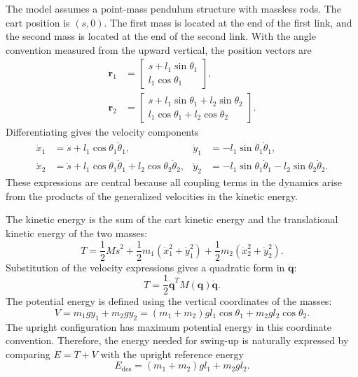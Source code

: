 \documentclass[11pt,a4paper]{article}
\begin{document}
The model assumes a point-mass pendulum structure with massless rods. The cart position is $(s,0)$. The first mass is located at the end of the first link, and the second mass is located at the end of the second link. With the angle convention measured from the upward vertical, the position vectors are
\begin{align}
    \bm r_1 &=
    \begin{bmatrix}
        s + l_1\sin\theta_1\\
        l_1\cos\theta_1
    \end{bmatrix},\\
    \bm r_2 &=
    \begin{bmatrix}
        s + l_1\sin\theta_1 + l_2\sin\theta_2\\
        l_1\cos\theta_1 + l_2\cos\theta_2
    \end{bmatrix}.
\end{align}
Differentiating gives the velocity components
\begin{align}
    \dot{x}_1 &= \dot{s}+l_1\cos\theta_1\dot{\theta}_1,
    &\dot{y}_1 &= -l_1\sin\theta_1\dot{\theta}_1,\\
    \dot{x}_2 &= \dot{s}+l_1\cos\theta_1\dot{\theta}_1
        +l_2\cos\theta_2\dot{\theta}_2,
    &\dot{y}_2 &= -l_1\sin\theta_1\dot{\theta}_1
        -l_2\sin\theta_2\dot{\theta}_2.
\end{align}
These expressions are central because all coupling terms in the dynamics arise from the products of the generalized velocities in the kinetic energy.

The kinetic energy is the sum of the cart kinetic energy and the translational kinetic energy of the two masses:
\begin{equation}
    T =
    \frac{1}{2}M\dot{s}^{2}
    + \frac{1}{2}m_1(\dot{x}_1^2+\dot{y}_1^2)
    + \frac{1}{2}m_2(\dot{x}_2^2+\dot{y}_2^2).
\end{equation}
Substitution of the velocity expressions gives a quadratic form in $\dot{\bm q}$:
\begin{equation}
    T = \frac{1}{2}\dot{\bm q}^{T}M(\bm q)\dot{\bm q}.
\end{equation}
The potential energy is defined using the vertical coordinates of the masses:
\begin{equation}
    V = m_1gy_1 + m_2gy_2
      = (m_1+m_2)gl_1\cos\theta_1
        +m_2gl_2\cos\theta_2.
\end{equation}
The upright configuration has maximum potential energy in this coordinate convention. Therefore, the energy needed for swing-up is naturally expressed by comparing $E=T+V$ with the upright reference energy
\begin{equation}
    E_{\mathrm{des}}=(m_1+m_2)gl_1+m_2gl_2.
\end{equation}
\end{document}
